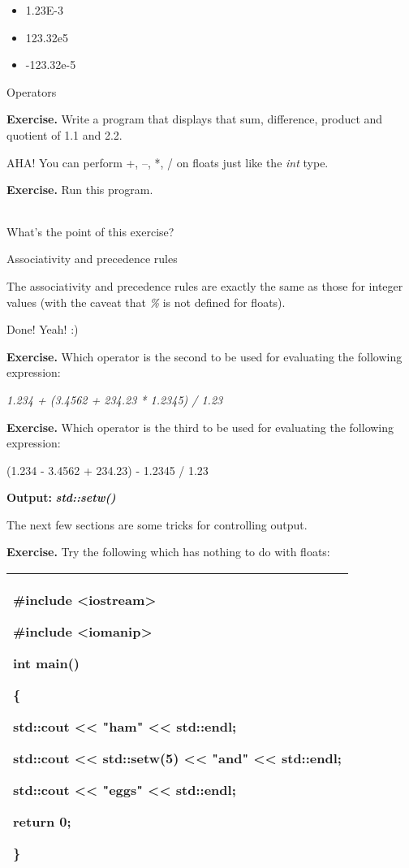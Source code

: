 \documentclass[
]{article}
\providecommand{\tightlist}{%
  \setlength{\itemsep}{0pt}\setlength{\parskip}{0pt}}
\begin{document}
\begin{itemize}
\tightlist
\item
  1.23E-3
\item
  123.32e5
\item
  -123.32e-5
\end{itemize}

Operators

\textbf{Exercise.} Write a program that displays that sum, difference,
product and quotient of 1.1 and 2.2.

AHA! You can perform +, --, *, / on floats just like the \emph{int}
type.

\textbf{Exercise.} Run this program.

\begin{longtable}[]{@{}@{}}
\toprule
\endhead
\bottomrule
\end{longtable}

What's the point of this exercise?

Associativity and precedence rules

The associativity and precedence rules are exactly the same as those for
integer values (with the caveat that \emph{\%} is not defined for
floats).

Done! Yeah! :)

\textbf{Exercise.} Which operator is the second to be used for
evaluating the following expression:

\emph{1.234 + (3.4562 + 234.23 * 1.2345) / 1.23}

\textbf{Exercise.} Which operator is the third to be used for evaluating
the following expression:

(1.234 - 3.4562 + 234.23) - 1.2345 / 1.23

\textbf{Output: }\emph{\textbf{std::setw()}}

The next few sections are some tricks for controlling output.

\textbf{Exercise.} Try the following which has nothing to do with
floats:

\begin{longtable}[]{@{}l@{}}
\toprule
\endhead
\begin{minipage}[t]{0.97\columnwidth}\raggedright
\#include \textless iostream\textgreater{}

\#include \textless iomanip\textgreater{}

int main()

\{

std::cout \textless\textless{} "ham" \textless\textless{} std::endl;

std::cout \textless\textless{} \textbf{std::setw(5)}
\textless\textless{} "and" \textless\textless{} std::endl;

std::cout \textless\textless{} "eggs" \textless\textless{} std::endl;

return 0;

\}\strut
\end{minipage}\tabularnewline
\bottomrule
\end{longtable}
\end{document}
